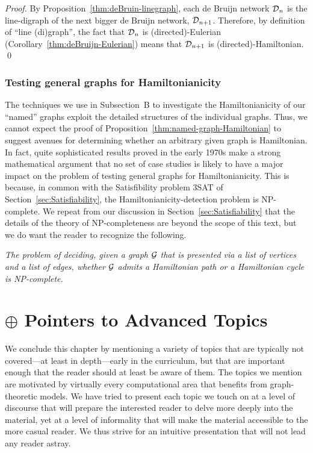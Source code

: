 \begin{proof}
By Proposition~\ref{thm:deBruin-linegraph}, each de Bruijn network
$\mbox{$\cal D$}_n$ is the line-digraph of the next bigger de Bruijn network,
$\mbox{$\cal D$}_{n+1}$.  Therefore, by definition of ``line (di)graph'', the fact
that $\mbox{$\cal D$}_n$ is (directed)-Eulerian
(Corollary~\ref{thm:deBruijn-Eulerian}) means that $\mbox{$\cal D$}_{n+1}$ is
(directed)-Hamiltonian.  \qed
\end{proof}


\subsubsection{Testing general graphs for Hamiltonianicity}
\label{sec:Hamiltonian-unweighted}

The techniques we use in Subsection~{\small\sf B} to investigate the
Hamiltonianicity of our ``named'' graphs exploit the detailed
structures of the individual graphs.  Thus, we cannot expect the proof
of Proposition~\ref{thm:named-graph-Hamiltonian} to suggest avenues
for determining whether an arbitrary given graph is Hamiltonian.  In
fact, quite sophisticated results proved in the early 1970s make a
strong mathematical argument that no set of case studies is likely to
have a major impact on the problem of testing general graphs for
Hamiltonianicity.  This is because, in common with the Satisfibility
problem {\sf 3SAT} of Section~\ref{sec:Satisfiability}, the
Hamiltonianicity-detection problem is {\sf NP}-complete.  We repeat
from our discussion in Section~\ref{sec:Satisfiability} that the
details of the theory of {\sf NP}-completeness are beyond the scope of
this text, but we do want the reader to recognize the following.
\begin{description}
\item
{\it The problem of deciding, given a graph $\mbox{$\cal G$}$ that is presented via
  a list of vertices and a list of edges, whether $\mbox{$\cal G$}$ admits a
  Hamiltonian path or a Hamiltonian cycle is {\sf NP}-complete.}
\end{description}



\section{$\oplus$ Pointers to Advanced Topics}
\label{sec:advanced-topics}


We conclude this chapter by mentioning a variety of topics that are
typically not covered---at least in depth---early in the curriculum,
but that are important enough that the reader should at least be aware
of them.  The topics we mention are motivated by virtually every
computational area that benefits from graph-theoretic models.  We have
tried to present each topic we touch on at a level of discourse that
will prepare the interested reader to delve more deeply into the
material, yet at a level of informality that will make the material
accessible to the more casual reader.  We thus strive for an intuitive
presentation that will not lead any reader astray.


